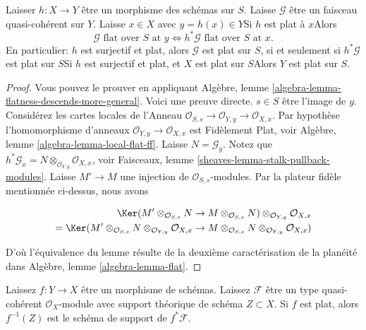 \begin{lemma}

\label{lemma-flat-permanence}

Laisser $h : X \to Y$ être un morphisme des schémas sur $S$. Laisse $\mathcal{G}$ être un faisceau quasi-cohérent sur $Y$. Laisse $x \in X$ avec $y = h(x) \in Y$Si $h$ est plat à $x$Alors
$$
\mathcal{G}\text{ flat over }S\text{ at }y
\Leftrightarrow
h^*\mathcal{G}\text{ flat over }S\text{ at }x.
$$
En particulier: $h$ est surjectif et plat, alors
$\mathcal{G}$ est plat sur $S$, si et seulement si
$h^*\mathcal{G}$ est plat sur $S$Si $h$ est surjectif et plat, et $X$ est plat sur $S$Alors $Y$ est plat sur $S$.

\end{lemma}

\begin{proof}

Vous pouvez le prouver en appliquant Algèbre, lemme \ref{algebra-lemma-flatness-descends-more-general}. Voici une preuve directe. $s \in S$ être l'image de $y$. Considérez les cartes locales de l'Anneau
$\mathcal{O}_{S, s} \to \mathcal{O}_{Y, y} \to \mathcal{O}_{X, x}$. Par hypothèse l'homomorphisme d'anneaux $\mathcal{O}_{Y, y} \to \mathcal{O}_{X, x}$
est Fidèlement Plat, voir Algèbre, lemme \ref{algebra-lemma-local-flat-ff}. Laisse $N = \mathcal{G}_y$. Notez que
$h^*\mathcal{G}_x = N \otimes_{\mathcal{O}_{Y, y}} \mathcal{O}_{X, x}$, voir Faisceaux, lemme \ref{sheaves-lemma-stalk-pullback-modules}. Laisse $M' \to M$ une injection de $\mathcal{O}_{S, s}$-modules. Par la plateur fidèle mentionnée ci-dessus, nous avons

\begin{align*}
\Ker(
M' \otimes_{\mathcal{O}_{S, s}} N \to M \otimes_{\mathcal{O}_{S, s}} N)
\otimes_{\mathcal{O}_{Y, y}} \mathcal{O}_{X, x} \\
=
\Ker(
M' \otimes_{\mathcal{O}_{S, s}} N
\otimes_{\mathcal{O}_{Y, y}} \mathcal{O}_{X, x}
\to
M \otimes_{\mathcal{O}_{S, s}} N
\otimes_{\mathcal{O}_{Y, y}} \mathcal{O}_{X, x})
\end{align*}

D'où l'équivalence du lemme résulte de la deuxième caractérisation de la planéité dans Algèbre, lemme \ref{algebra-lemma-flat}.

\end{proof}

\begin{lemma}

\label{lemma-flat-pullback-support}
Laissez $f : Y \to X$ être un morphisme de schémas. Laissez $\mathcal{F}$ être un type quasi-cohérent $\mathcal{O}_X$-module avec support théorique de schéma $Z \subset X$. Si $f$ est plat, alors $f^{-1}(Z)$ est le schéma de support de $f^*\mathcal{F}$.
\end{lemma}


